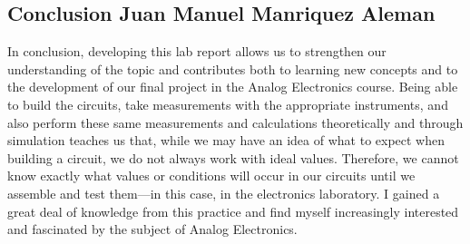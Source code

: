\subsection{Conclusion Juan Manuel Manriquez Aleman}

In conclusion, developing this lab report allows us to strengthen our understanding of the topic and 
contributes both to learning new concepts and to the development of our final project in the Analog 
Electronics course. Being able to build the circuits, take measurements with the appropriate instruments, 
and also perform these same measurements and calculations theoretically and through simulation teaches us 
that, while we may have an idea of what to expect when building a circuit, we do not always work with 
ideal values. Therefore, we cannot know exactly what values or conditions will occur in our circuits 
until we assemble and test them—in this case, in the electronics laboratory. I gained a great deal of 
knowledge from this practice and find myself increasingly interested and fascinated by the subject of 
Analog Electronics.